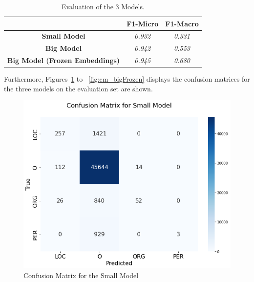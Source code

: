 \documentclass{article}
\newcommand\Tstrut{\rule{0pt}{2.6ex}}         %
\newcommand\Bstrut{\rule[-0.9ex]{0pt}{0pt}}   %
\begin{document}
\begin{table}[h!]
\centering
\begin{tabular}{c|cc}
\multicolumn{1}{l|}{}                  & \textbf{F1-Micro} & \textbf{F1-Macro} \Tstrut\Bstrut \\ \hline
\textbf{Small Model}                   & \textit{0.932}    & \textit{0.331} \Tstrut\Bstrut    \\
\textbf{Big Model}                     & \textit{0.942}    & \textit{0.553} \Tstrut\Bstrut   \\
\textbf{Big Model (Frozen Embeddings)} & \textit{0.945}    & \textit{0.680} \Tstrut\Bstrut  
\end{tabular}
\caption{Evaluation of the 3 Models.}
\label{tab:model_eval_f1}
\end{table}

Furthermore, Figures~\ref{fig:cm_small} to ~\ref{fig:cm_bigFrozen} displays the confusion matrices for the three models on the evaluation set are shown.


\begin{figure}[]
    \centering
    \includegraphics[scale=0.5]{confusion_matrix_smallModel.png}
    \caption{Confusion Matrix for the Small Model}
    \label{fig:cm_small}
\end{figure}
\end{document}

